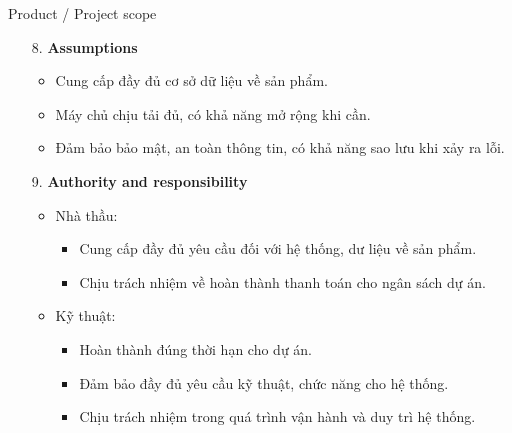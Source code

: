 \documentclass[compress]{beamer}
\begin{document}
\begin{frame}{Product / Project scope}
\begin{itemize}
\item[8. ] \textbf{Assumptions}
\begin{itemize}
\item Cung cấp đầy đủ cơ sở dữ liệu về sản phẩm.
\item Máy chủ chịu tải đủ, có khả năng mở rộng khi cần.
\item Đảm bảo bảo mật, an toàn thông tin, có khả năng sao lưu khi xảy ra lỗi.
\end{itemize}
\item[9. ] \textbf{Authority and responsibility}
\begin{itemize}
\item Nhà thầu:
\begin{itemize}
\item Cung cấp đầy đủ yêu cầu đối với hệ thống, dư liệu về sản phẩm.
\item Chịu trách nhiệm về hoàn thành thanh toán cho ngân sách dự án.
\end{itemize}
\item Kỹ thuật:
\begin{itemize}
\item Hoàn thành đúng thời hạn cho dự án.
\item Đảm bảo đầy đủ yêu cầu kỹ thuật, chức năng cho hệ thống.
\item Chịu trách nhiệm trong quá trình vận hành và duy trì hệ thống.
\end{itemize}
\end{itemize}
\end{itemize}
\end{frame}
\end{document}
